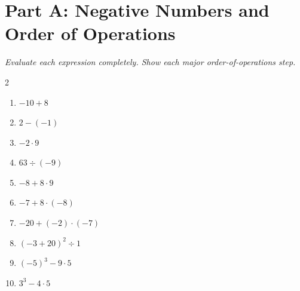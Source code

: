 \documentclass[11pt]{article}
\begin{document}
\section*{Part A: Negative Numbers and Order of Operations}
\noindent\textit{Evaluate each expression completely. Show each major order-of-operations step.}
\begin{multicols}{2}
\begin{enumerate}
  \item $-10 + 8$
  \vspace{1.1cm}
  \item $2 - (-1)$
  \vspace{1.1cm}
  \item $-2 \cdot 9$
  \vspace{1.1cm}
  \item $63 \div (-9)$
  \vspace{1.1cm}
  \item $-8 + 8 \cdot 9$
  \vspace{1.1cm}
  \item $-7 + 8 \cdot (-8)$
  \vspace{1.1cm}
  \item $-20 + (-2) \cdot (-7)$
  \vspace{1.1cm}
  \item $(-3 + 20)^{2} \div 1$
  \vspace{1.1cm}
  \item $(-5)^{3} - 9 \cdot 5$
  \vspace{1.1cm}
  \item $3^{3} - 4 \cdot 5$
  \vspace{1.1cm}
\end{enumerate}
\end{multicols}
\end{document}
